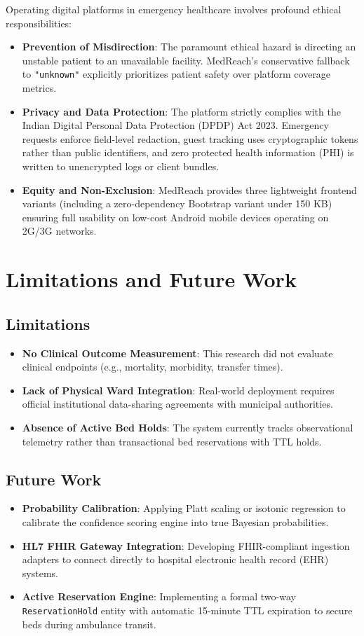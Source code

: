 \documentclass[conference]{IEEEtran}
\begin{document}
Operating digital platforms in emergency healthcare involves profound ethical responsibilities:
\begin{itemize}
    \item \textbf{Prevention of Misdirection}: The paramount ethical hazard is directing an unstable patient to an unavailable facility. MedReach's conservative fallback to \texttt{"unknown"} explicitly prioritizes patient safety over platform coverage metrics.
    \item \textbf{Privacy and Data Protection}: The platform strictly complies with the Indian Digital Personal Data Protection (DPDP) Act 2023. Emergency requests enforce field-level redaction, guest tracking uses cryptographic tokens rather than public identifiers, and zero protected health information (PHI) is written to unencrypted logs or client bundles.
    \item \textbf{Equity and Non-Exclusion}: MedReach provides three lightweight frontend variants (including a zero-dependency Bootstrap variant under 150 KB) ensuring full usability on low-cost Android mobile devices operating on 2G/3G networks.
\end{itemize}

\section{Limitations and Future Work}

\subsection{Limitations}
\begin{itemize}
    \item \textbf{No Clinical Outcome Measurement}: This research did not evaluate clinical endpoints (e.g., mortality, morbidity, transfer times).
    \item \textbf{Lack of Physical Ward Integration}: Real-world deployment requires official institutional data-sharing agreements with municipal authorities.
    \item \textbf{Absence of Active Bed Holds}: The system currently tracks observational telemetry rather than transactional bed reservations with TTL holds.
\end{itemize}

\subsection{Future Work}
\begin{itemize}
    \item \textbf{Probability Calibration}: Applying Platt scaling or isotonic regression to calibrate the confidence scoring engine into true Bayesian probabilities.
    \item \textbf{HL7 FHIR Gateway Integration}: Developing FHIR-compliant ingestion adapters to connect directly to hospital electronic health record (EHR) systems.
    \item \textbf{Active Reservation Engine}: Implementing a formal two-way \texttt{ReservationHold} entity with automatic 15-minute TTL expiration to secure beds during ambulance transit.
\end{itemize}
\end{document}
